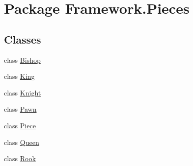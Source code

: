\hypertarget{namespace_framework_1_1_pieces}{}\section{Package Framework.\+Pieces}
\label{namespace_framework_1_1_pieces}
\subsection*{Classes}
\begin{DoxyCompactItemize}
\item 
class \hyperlink{class_framework_1_1_pieces_1_1_bishop}{Bishop}
\item 
class \hyperlink{class_framework_1_1_pieces_1_1_king}{King}
\item 
class \hyperlink{class_framework_1_1_pieces_1_1_knight}{Knight}
\item 
class \hyperlink{class_framework_1_1_pieces_1_1_pawn}{Pawn}
\item 
class \hyperlink{class_framework_1_1_pieces_1_1_piece}{Piece}
\item 
class \hyperlink{class_framework_1_1_pieces_1_1_queen}{Queen}
\item 
class \hyperlink{class_framework_1_1_pieces_1_1_rook}{Rook}
\end{DoxyCompactItemize}
